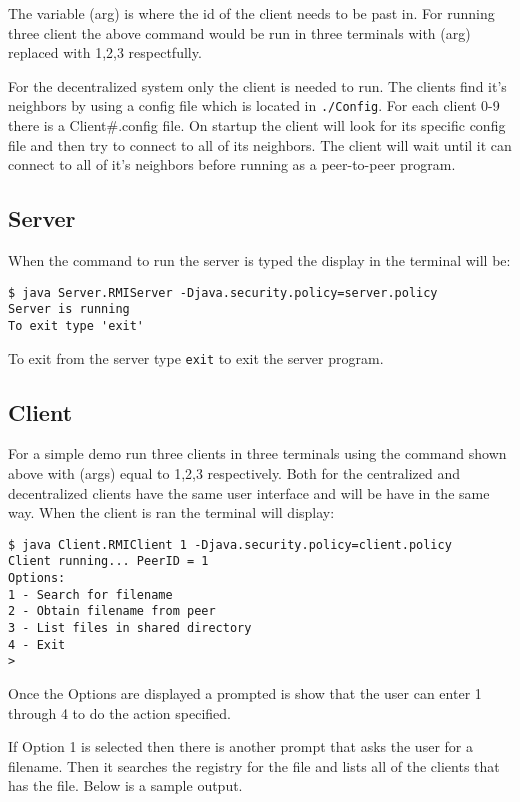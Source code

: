 \documentclass{article}
\begin{document}
The variable (arg) is where the id of the client needs to be past in. For running three client the above command would be run in three terminals with (arg) replaced with 1,2,3 respectfully. 

For the decentralized system only the client is needed to run. The clients find it's neighbors by using a config file which is located in \texttt{./Config}. For each client 0-9 there is a Client\#.config file. On startup the client will look for its specific config file and then try to connect to all of its neighbors. The client will wait until it can connect to all of it's neighbors before running as a peer-to-peer program.


\subsection*{Server} 
When the command to run the server is typed the display in the terminal will be:

\begin{verbatim}
$ java Server.RMIServer -Djava.security.policy=server.policy
Server is running
To exit type 'exit'
\end{verbatim}

To exit from the server type \texttt{exit} to exit the server program. 

\subsection*{Client}
For a simple demo run three clients in three terminals using the command shown above with (args) equal to 1,2,3 respectively. Both for the centralized and decentralized clients have the same user interface and will be have in the same way. When the client is ran the terminal will display:

\begin{verbatim}
$ java Client.RMIClient 1 -Djava.security.policy=client.policy
Client running... PeerID = 1
Options:
1 - Search for filename
2 - Obtain filename from peer
3 - List files in shared directory
4 - Exit
>
\end{verbatim}

Once the Options are displayed a prompted is show that the user can enter 1 through 4 to do the action specified. 

If Option 1 is selected then there is another prompt that asks the user for a filename. Then it searches the registry for the file and lists all of the clients that has the file. Below is a sample output. 
\end{document}
